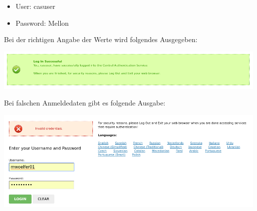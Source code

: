 \begin{itemize}
	\item User: casuser
	\item Password: Mellon
\end{itemize}

Bei der richtigen Angabe der Werte wird folgendes Ausgegeben:

\begin{minipage}{\linewidth}
	\centering
	\includegraphics[width=1\linewidth]{images/funzt_3}
\end{minipage}

Bei falschen Anmeldedaten gibt es folgende Ausgabe:

\begin{minipage}{\linewidth}
	\centering
	\includegraphics[width=1\linewidth]{images/funzt_4}
\end{minipage}